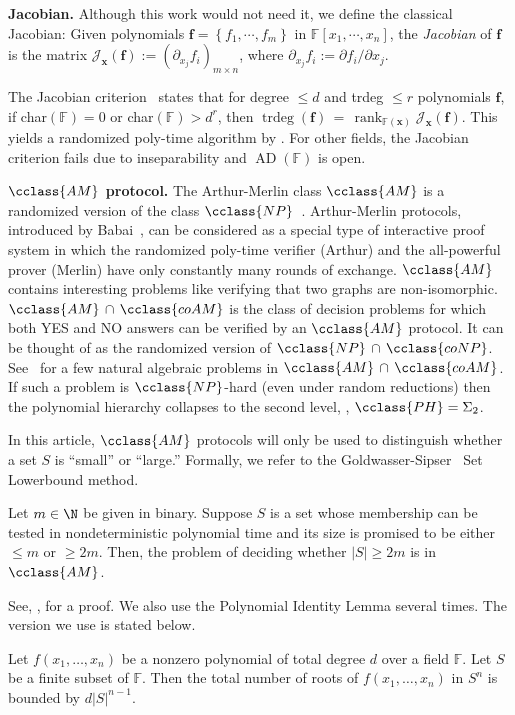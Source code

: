 \documentclass{toc}
\newcommand{\F}{\mathbb{F}}
\DeclareMathOperator{\rk}{\mathrm{rank}}
\DeclareMathOperator{\trdeg}{\mathrm{trdeg}}
\newcommand{\pder}[2]{\partial_{#2}#1}
\newcommand{\inbrace }[1]{\left\{#1\right\}}
\newcommand{\NP}{\cclass{NP}\xspace}  %
\newcommand{\coNP}{\cclass{coNP}\xspace}  %
\newcommand{\NPcapcoNP}{\NP\,\cap\,\coNP}  %
\newcommand{\AM}{\cclass{AM}\xspace}  %
\newcommand{\coAM}{\cclass{coAM}\xspace}  %
\newcommand{\AMcapcoAM}{\AM\,\cap\,\coAM}  %
\newcommand{\PH}{\cclass{PH}\xspace}  %
\DeclareMathOperator{\AD}{\mathrm{AD}\xspace} %
\begin{document}
\textbf{Jacobian.}
Although this work would not need it, we define the classical Jacobian: 
%
Given polynomials $\mathbf{f} = \inbrace{f_1, \cdots, f_m}$ in $\F[x_1,\cdots, x_n]$, the \emph{Jacobian} of $\mathbf{f}$ %
is the matrix $\mathcal{J}_{\mathbf{x}}(\mathbf{f}) := (\pder{f_i}{x_j})_{m \times n}$, where $\pder{f_i}{x_j} := \partial f_i/ \partial x_j$. 

The Jacobian criterion~\cite{Jac41, BMS13}
%
states that for  %
degree $\le d$ and trdeg $\le r$ polynomials $\mathbf{f}$, if char$(\F) = 0$ or char$(\F) > d^r$, 
then $\trdeg(\mathbf{f}) \,=\, \rk_{\F(\mathbf{x})} \mathcal{J}_{\mathbf{x}}(\mathbf{f})$. This yields a randomized poly-time algorithm 
%
by . %
For other fields, the Jacobian criterion fails due to inseparability and
%
$\AD(\F)$    %
is open.

\smallskip\noindent
\textbf{$\AM$ protocol.}
The %
Arthur-Merlin class $\AM$ is a randomized version of the class
$\NP$~\cite{AB09}.
Arthur-Merlin protocols, introduced by Babai~\cite{babai1985trading}, can be considered as a special type of interactive proof system in which the randomized poly-time verifier (Arthur) and the all-powerful prover (Merlin) have only constantly many rounds of exchange. 
$\AM$ contains interesting problems like
%
verifying that   %
two graphs are non-isomorphic.
%
$\AMcapcoAM$   %
is the class of decision problems for which both YES and NO answers can be verified by an $\AM$ protocol. It can be thought of as the randomized version of
%
$\NPcapcoNP$.    %
See~\cite{kayal2006complexity} for a few natural algebraic problems in
%
$\AMcapcoAM$.
If such a problem is $\NP$-hard (even under random reductions) then
the %
polynomial hierarchy collapses to the
%
second level,   %
\ie, 
%
$\PH=\Sigma_2$. %

In this
%
article, $\AM$ protocols  %
will only be used to distinguish whether a set $S$ is ``small'' 
or ``large.'' Formally, we refer to the Goldwasser-Sipser~\cite{goldwasser1986private} Set Lowerbound 
%
method. %
\begin{lemma} \label{lem_amprotocol}
Let $m\in\N$ be given in binary. Suppose $S$ is a set whose membership can be tested in nondeterministic polynomial time and its size is promised to be either $\le m$ or $\ge 2m$. Then, the problem of deciding whether 
%
$|S| \ge 2m$ %
is in $\AM$.
\end{lemma}
 See, \eg, \cite[Chapter~8]{AB09} for a proof.
We also use the
%
Polynomial Identity Lemma  %
several times.
 The version we use is stated below.
 \begin{lemma} \label{Polynomial Identity}
Let $f(x_1,\ldots,x_n)$ be a nonzero polynomial of total degree $d$ over a field $\F$. Let $S$ be a finite subset of $\F$. Then the total number of roots of $f(x_1,\ldots,x_n)$ in $S^n$ is bounded by $d|S|^{n-1}$.  
\end{lemma}
\end{document}
